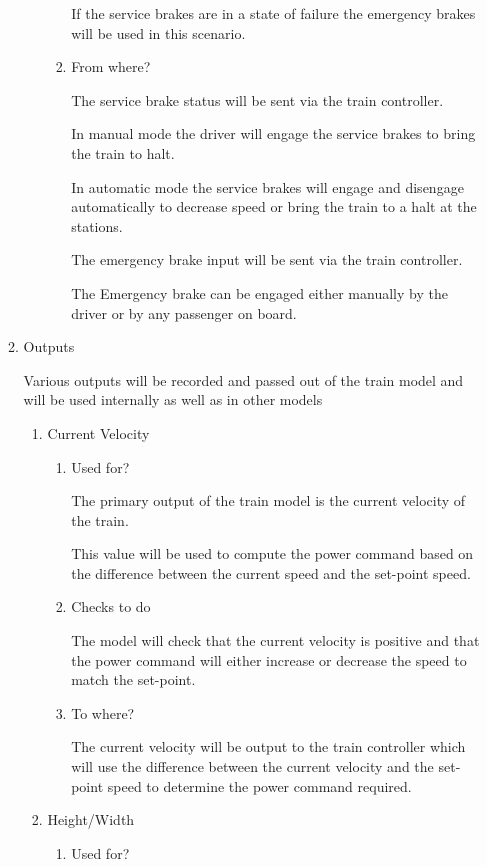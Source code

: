 \documentclass[11pt]{article}
\begin{document}
\begin{enumerate}
\begin{enumerate}
\begin{enumerate}
\begin{enumerate}
If the service brakes are in a state of failure the emergency brakes will be used in this scenario.
\item From where?
\label{sec-3-1-4-2-1-6-3}

The service brake status will be sent via the train controller.

In manual mode the driver will engage the service brakes to bring the train to halt. 

In automatic mode the service brakes will engage and disengage automatically to decrease speed or bring the train to a halt at the stations.

The emergency brake input will be sent via the train controller.

The Emergency brake can be engaged either manually by the driver or by any passenger on board.
\end{enumerate}
\end{enumerate}

\item Outputs
\label{sec-3-1-4-2-2}

Various outputs will be recorded and passed out of the train model and will be used internally as well as in other models
\begin{enumerate}
\item Current Velocity
\label{sec-3-1-4-2-2-1}
\begin{enumerate}
\item Used for?
\label{sec-3-1-4-2-2-1-1}

The primary output of the train model is the current velocity of the train. 

This value will be used to compute the power command based on the difference between the current speed and the set-point speed.
\item Checks to do
\label{sec-3-1-4-2-2-1-2}

The model will check that the current velocity is positive and that the power command will either increase or decrease the speed to match the set-point.
\item To where?
\label{sec-3-1-4-2-2-1-3}

The current velocity will be output to the train controller which will use the difference between the current velocity and the set-point speed to determine the power command required.
\end{enumerate}
\item Height/Width
\label{sec-3-1-4-2-2-2}
\begin{enumerate}
\item Used for?
\label{sec-3-1-4-2-2-2-1}


\end{enumerate}
\end{enumerate}
\end{enumerate}
\end{enumerate}
\end{document}
